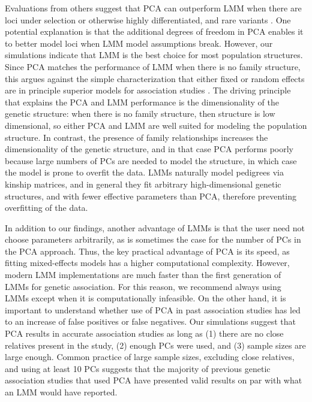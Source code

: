 \documentclass[11pt]{article}
\begin{document}
Evaluations from others suggest that PCA can outperform LMM when there are loci under selection or otherwise highly differentiated, and rare variants \citep{price_new_2010, wu_comparison_2011, yang_advantages_2014}.
One potential explanation is that the additional degrees of freedom in PCA enables it to better model loci when LMM model assumptions break.
However, our simulations indicate that LMM is the best choice for most population structures.
Since PCA matches the performance of LMM when there is no family structure, this argues against the simple characterization that either fixed or random effects are in principle superior models for association studies \citep{price_new_2010, sul_mixed_2013, price_response_2013, sul_population_2018}.
The driving principle that explains the PCA and LMM performance is the dimensionality of the genetic structure:
when there is no family structure, then structure is low dimensional, so either PCA and LMM are well suited for modeling the population structure.
In contrast, the presence of family relationships increases the dimensionality of the genetic structure, and in that case PCA performs poorly because large numbers of PCs are needed to model the structure, in which case the model is prone to overfit the data.
LMMs naturally model pedigrees via kinship matrices, and in general they fit arbitrary high-dimensional genetic structures, and with fewer effective parameters than PCA, therefore preventing overfitting of the data.

In addition to our findings, another advantage of LMMs is that the user need not choose parameters arbitrarily, as is sometimes the case for the number of PCs in the PCA approach.
Thus, the key practical advantage of PCA is its speed, as fitting mixed-effects models has a higher computational complexity.
However, modern LMM implementations are much faster than the first generation of LMMs for genetic association.
For this reason, we recommend always using LMMs except when it is computationally infeasible.
On the other hand, it is important to understand whether use of PCA in past association studies has led to an increase of false positives or false negatives.
Our simulations suggest that PCA results in accurate association studies as long as
(1) there are no close relatives present in the study,
(2) enough PCs were used, and
(3) sample sizes are large enough.
Common practice of large sample sizes, excluding close relatives, and using at least 10 PCs suggests that the majority of previous genetic association studies that used PCA have presented valid results on par with what an LMM would have reported.

\printbibliography
\end{document}
